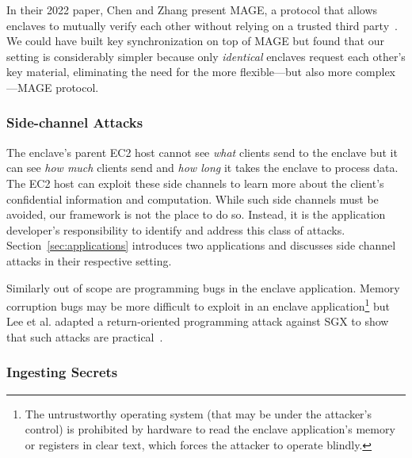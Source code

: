In their 2022 paper, Chen and Zhang present MAGE, a protocol that allows
enclaves to mutually verify each other without relying on a trusted third
party~\cite{Chen2022a}.  We could have built key synchronization on top of MAGE
but found that our setting is considerably simpler because only \emph{identical}
enclaves request each other's key material, eliminating the need for the more
flexible---but also more complex---MAGE protocol.

\subsubsection{Side-channel Attacks}
\label{sec:side-channels}

The enclave's parent EC2 host cannot see \emph{what} clients send to the enclave
but it can see \emph{how much} clients send and \emph{how long} it takes the
enclave to process data.  The EC2 host can exploit these side channels to learn
more about the client's confidential information and computation.  While such
side channels must be avoided, our framework is not the place to do so.
Instead, it is the application developer's responsibility to identify and
address this class of attacks.  Section~\ref{sec:applications} introduces two
applications and discusses side channel attacks in their respective setting.

Similarly out of scope are programming bugs in the enclave application.  Memory
corruption bugs may be more difficult to exploit in an enclave
application\footnote{The untrustworthy operating system (that may be under the
attacker's control) is prohibited by hardware to read the enclave application's
memory or registers in clear text, which forces the attacker to operate
blindly.} but Lee et al. adapted a return-oriented programming attack against
SGX to show that such attacks are practical~\cite{Lee2017a}.

\subsubsection{Ingesting Secrets}
\label{sec:secrets}

